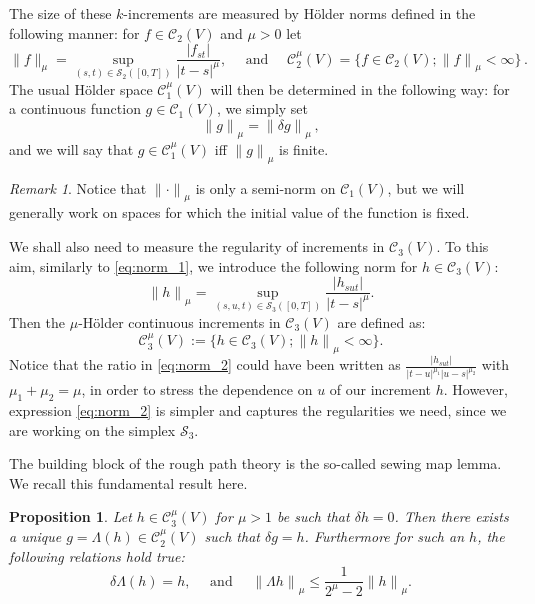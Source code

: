 \documentclass[12pt,reqno]{amsart}
\numberwithin{equation}{section}  %
\newcommand{\der}{\delta}
\newcommand{\1}{{\bf 1}}
\newcommand{\2}{{\bf 2}}
\newcommand{\cac}{\mathcal C}
\newcommand{\cs}{\mathcal S}
\newtheorem{proposition}[theorem]{Proposition}
\theoremstyle{remark}
\newtheorem{remark}[theorem]{Remark}
\theoremstyle{remark}
\begin{document}
\noindent
The size of these $k$-increments are measured by H\"older norms defined in the following manner: for $f \in \cac_{2}(V)$ and $\mu > 0$ let
\begin{equation}\label{eq:norm_1}
\|f\|_{\mu} = \sup_{(s,t) \in \mathcal{S}_2([0,T])} \dfrac{|f_{st}|}{{|t-s|}^{\mu}},
\quad\text{  and  }\quad
\cac_2^{\mu}(V) = \lbrace f \in \cac_2(V); {\|f\|}_{\mu} < \infty \rbrace \, .
\end{equation}
The usual H\"older space $\cac_1^{\mu}(V)$ will then be determined in the following way: for a continuous function $g \in \cac_{1}(V)$, we simply set
\begin{equation*}
{\|g\|}_{\mu} = {\|\der g\|}_{\mu} \, ,
\end{equation*}
and we will say that $g \in \cac_1^{\mu}(V)$ iff ${\|g\|}_{\mu}$ is finite. 
\begin{remark} 
	Notice that ${\|\cdot\|}_{\mu}$ is only a semi-norm on $\cac_1(V)$, but we will generally work on spaces for which the initial value of the function is fixed.
\end{remark}

We shall also need to measure the regularity of increments in $\cac_3(V)$. To this aim, similarly to \eqref{eq:norm_1}, we introduce the following norm for $h \in \cac_3(V)$:
\begin{equation}\label{eq:norm_2}
{\|h\|}_{\mu} = \sup_{(s,u,t) \in \mathcal{S}_3([0,T])} \dfrac{|h_{sut}|}{{|t-s|}^{\mu}}.
\end{equation}
Then the $\mu$-H\"older continuous increments in $\cac_3(V)$ are defined as:
\begin{equation*}
\cac_3^{\mu}(V) := \lbrace h \in \cac_{3}(V); {\|h\|}_{\mu} < \infty \rbrace .
\end{equation*}
{Notice that the ratio in \eqref{eq:norm_2} could have been written as $\frac{|h_{sut}|}{|t-u|^{\mu_{1}} |u-s|^{\mu_{2}}}$ with $\mu_{1}+\mu_{2}=\mu$, in order to stress the dependence on $u$ of our increment $h$. However, expression \eqref{eq:norm_2} is simpler and captures the regularities we need, since we are working on the simplex $\cs_{3}$.}

The building block of the {rough path} theory is the so-called sewing map lemma. We recall this fundamental result here.\begin{proposition}\label{prop:La}
	Let $h \in \cac_3^{\mu}(V)$ for $\mu > 1$ be such that $\der h = 0$. Then there exists a unique $g = \Lambda(h) \in \cac_2^{\mu}(V)$ such that $\der g = h$. Furthermore for such an $h$, the following relations hold true:
	\begin{equation*}
	\der \Lambda(h) = h ,
	\quad\text{  and  }\quad
{\|\Lambda h\|}_{\mu} \leq \dfrac{1}{2^{\mu} - 2} {\|h\|}_{\mu} .
	\end{equation*}
\end{proposition}
\end{document}
